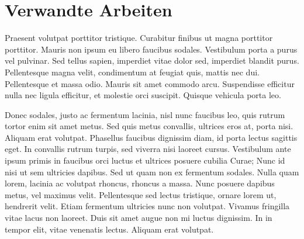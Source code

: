 \documentclass[german]{cgspaper} %
\begin{document}

\section{Verwandte Arbeiten}
\label{sec:VerwandteArbeiten}
Praesent volutpat porttitor tristique. Curabitur finibus ut magna porttitor porttitor. Mauris non ipsum eu libero faucibus sodales. Vestibulum porta a purus vel pulvinar. Sed tellus sapien, imperdiet vitae dolor sed, imperdiet blandit purus. Pellentesque magna velit, condimentum at feugiat quis, mattis nec dui. Pellentesque et massa odio. Mauris sit amet commodo arcu. Suspendisse efficitur nulla nec ligula efficitur, et molestie orci suscipit. Quisque vehicula porta leo.

Donec sodales, justo ac fermentum lacinia, nisl nunc faucibus leo, quis rutrum tortor enim sit amet metus. Sed quis metus convallis, ultrices eros at, porta nisi. Aliquam erat volutpat. Phasellus faucibus dignissim diam, id porta lectus sagittis eget. In convallis rutrum turpis, sed viverra nisi laoreet cursus. Vestibulum ante ipsum primis in faucibus orci luctus et ultrices posuere cubilia Curae; Nunc id nisi ut sem ultricies dapibus. Sed ut quam non ex fermentum sodales. Nulla quam lorem, lacinia ac volutpat rhoncus, rhoncus a massa. Nunc posuere dapibus metus, vel maximus velit. Pellentesque sed lectus tristique, ornare lorem ut, hendrerit velit. Etiam fermentum ultricies nunc non volutpat. Vivamus fringilla vitae lacus non laoreet. Duis sit amet augue non mi luctus dignissim. In in tempor elit, vitae venenatis lectus. Aliquam erat volutpat.



\end{document}
